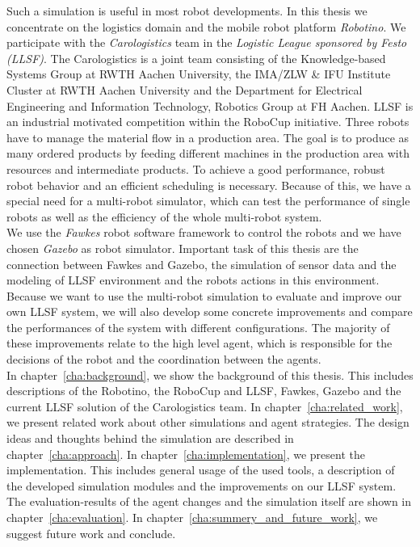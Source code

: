 Such a simulation is useful in most robot developments. In this thesis we concentrate on the logistics domain and the mobile robot platform \textit{Robotino}. We participate with the \textit{Carologistics} team in the \textit{Logistic League sponsored by Festo (LLSF)}. The Carologistics is a joint team consisting of the Knowledge-based Systems Group at RWTH Aachen University, the IMA/ZLW \& IFU Institute Cluster at RWTH Aachen University and the Department for Electrical Engineering and Information Technology, Robotics Group at FH Aachen. LLSF is an industrial motivated competition within the RoboCup initiative. Three robots have to manage the material flow in a production area. The goal is to produce as many ordered products by feeding different machines in the production area with resources and intermediate products. To achieve a good performance, robust robot behavior and an efficient scheduling is necessary. Because of this, we have a special need for a multi-robot simulator, which can test the performance of single robots as well as the efficiency of the whole multi-robot system.\\
We use the \textit{Fawkes} robot software framework to control the robots and we have chosen \textit{Gazebo} as robot simulator. Important task of this thesis are the connection between Fawkes and Gazebo, the simulation of sensor data and the modeling of LLSF environment and the robots actions in this environment. Because we want to use the multi-robot simulation to evaluate and improve our own LLSF system, we will also develop some concrete improvements and compare the performances of the system with different configurations. The majority of these improvements relate to the high level agent, which is responsible for the decisions of the robot and the coordination between the agents.
\\
In chapter~\ref{cha:background}, we show the background of this thesis. This includes descriptions of the Robotino, the RoboCup and LLSF, Fawkes, Gazebo and the current LLSF solution of the Carologistics team. In chapter~\ref{cha:related_work}, we present related work about other simulations and agent strategies. The design ideas and thoughts behind the simulation are described in chapter~\ref{cha:approach}. In chapter~\ref{cha:implementation}, we present the implementation. This includes general usage of the used tools, a description of the developed simulation modules and the improvements on our LLSF system. The evaluation-results of the agent changes and the simulation itself are shown in chapter~\ref{cha:evaluation}. In chapter~\ref{cha:summery_and_future_work}, we suggest future work and conclude.
